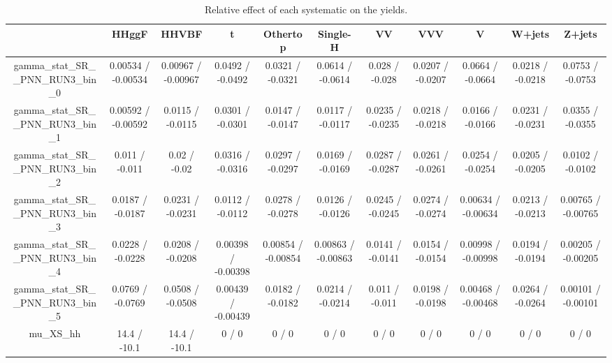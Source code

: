 \documentclass[10pt]{article}
\begin{document}
\begin{table}[htbp]
\begin{center}
\begin{tabular}{|c|c|c|c|c|c|c|c|c|c|c|}
\hline 
      & HHggF      & HHVBF      & t      & Othertop      & Single-H      & VV      & VVV      & V      & W+jets      & Z+jets \\ 
\hline 
  gamma_stat_SR__PNN_RUN3_bin_0 & 0.00534 / -0.00534 & 0.00967 / -0.00967 & 0.0492 / -0.0492 & 0.0321 / -0.0321 & 0.0614 / -0.0614 & 0.028 / -0.028 & 0.0207 / -0.0207 & 0.0664 / -0.0664 & 0.0218 / -0.0218 & 0.0753 / -0.0753 \\ 
  gamma_stat_SR__PNN_RUN3_bin_1 & 0.00592 / -0.00592 & 0.0115 / -0.0115 & 0.0301 / -0.0301 & 0.0147 / -0.0147 & 0.0117 / -0.0117 & 0.0235 / -0.0235 & 0.0218 / -0.0218 & 0.0166 / -0.0166 & 0.0231 / -0.0231 & 0.0355 / -0.0355 \\ 
  gamma_stat_SR__PNN_RUN3_bin_2 & 0.011 / -0.011 & 0.02 / -0.02 & 0.0316 / -0.0316 & 0.0297 / -0.0297 & 0.0169 / -0.0169 & 0.0287 / -0.0287 & 0.0261 / -0.0261 & 0.0254 / -0.0254 & 0.0205 / -0.0205 & 0.0102 / -0.0102 \\ 
  gamma_stat_SR__PNN_RUN3_bin_3 & 0.0187 / -0.0187 & 0.0231 / -0.0231 & 0.0112 / -0.0112 & 0.0278 / -0.0278 & 0.0126 / -0.0126 & 0.0245 / -0.0245 & 0.0274 / -0.0274 & 0.00634 / -0.00634 & 0.0213 / -0.0213 & 0.00765 / -0.00765 \\ 
  gamma_stat_SR__PNN_RUN3_bin_4 & 0.0228 / -0.0228 & 0.0208 / -0.0208 & 0.00398 / -0.00398 & 0.00854 / -0.00854 & 0.00863 / -0.00863 & 0.0141 / -0.0141 & 0.0154 / -0.0154 & 0.00998 / -0.00998 & 0.0194 / -0.0194 & 0.00205 / -0.00205 \\ 
  gamma_stat_SR__PNN_RUN3_bin_5 & 0.0769 / -0.0769 & 0.0508 / -0.0508 & 0.00439 / -0.00439 & 0.0182 / -0.0182 & 0.0214 / -0.0214 & 0.011 / -0.011 & 0.0198 / -0.0198 & 0.00468 / -0.00468 & 0.0264 / -0.0264 & 0.00101 / -0.00101 \\ 
  mu_XS_hh & 14.4 / -10.1 & 14.4 / -10.1 & 0 / 0 & 0 / 0 & 0 / 0 & 0 / 0 & 0 / 0 & 0 / 0 & 0 / 0 & 0 / 0 \\ 
\hline 
\end{tabular} 
\caption{Relative effect of each systematic on the yields.} 
\end{center} 
\end{table} 
\end{document}
